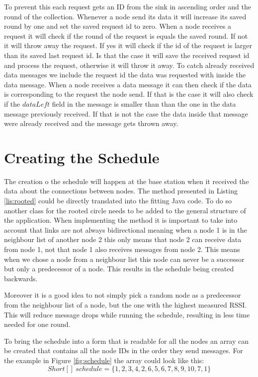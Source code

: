 To prevent this each request gets an ID from the sink in ascending order and the round of the collection. Whenever a node send its data it will increase its saved round by one and set the saved request id to zero. When a node receives a request it will check if the round of the request is equals the saved round. If not it will throw away the request. If yes it will check if the id of the request is larger than its saved last request id. Is that the case it will save the received request id and process the request, otherwise it will throw it away. To catch already received data messages we include the request id the data was requested with inside the data message. When a node receives a data message it can then check if the data is corresponding to the request the node send. If that is the case it will also check if the $dataLeft$ field in the message is smaller than than the one in the data message previously received. If that is not the case the data inside that message were already received and the message gets thrown away. 

\section{Creating the Schedule}
The creation o the schedule will happen at the base station when it received the data about the connections between nodes. The method presented in Listing \ref{lis:rooted} could be directly translated into the fitting Java code. To do so another class for the rooted circle needs to be added to the general structure of the application. When implementing the method it is important to take into account that links are not always bidirectional meaning when a node 1 is in the neighbour list of another node 2 this only means that node 2 can receive data from node 1, not that node 1 also receives messages from node 2. This means when we chose a node from a neighbour list this node can never be a successor but only a predecessor of a node. This results in the schedule being created backwards.

Moreover it is a good idea to not simply pick a random node as a predecessor from the neighbour list of a node, but the one with the highest measured RSSI. This will reduce message drops while running the schedule, resulting in less time needed for one round.  

To bring the schedule into a form that is readable for all the nodes an array can be created that contains all the node IDs in the order they send messages. For the example in Figure \ref{fig:schedule} the array could look like this: 
\[ Short[]\ schedule = \{1, 2, 3, 4, 2, 6, 5, 6, 7, 8, 9, 10, 7, 1\}\]     
